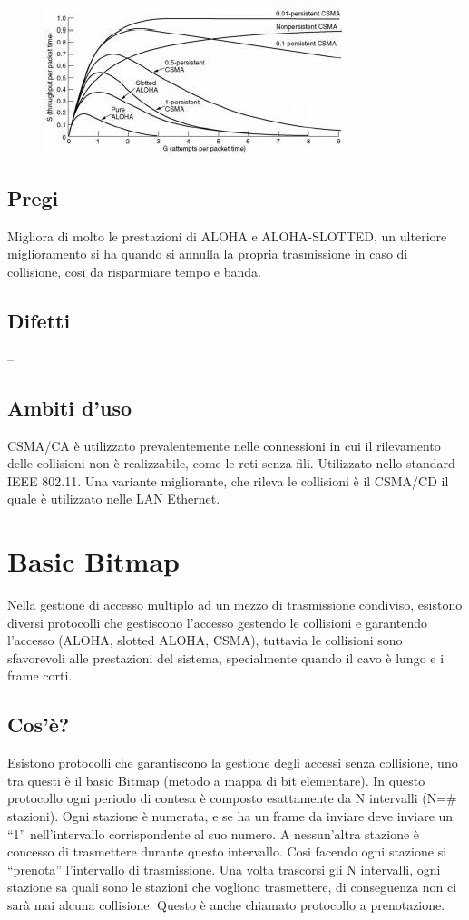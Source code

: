 \begin{figure}[H]
\centering
\includegraphics[scale=1]{res/img/23_CSMA.png}
\end{figure}

\subsection{Pregi}
Migliora di molto le prestazioni di ALOHA e ALOHA-SLOTTED, un ulteriore miglioramento si ha quando si annulla la propria trasmissione in caso di collisione, cosi da risparmiare tempo e banda.

\subsection{Difetti}
--

\subsection{Ambiti d'uso}
CSMA/CA è utilizzato prevalentemente nelle connessioni in cui il rilevamento delle collisioni non è realizzabile, come le reti senza fili.
Utilizzato nello standard IEEE 802.11.
Una variante migliorante, che rileva le collisioni è il CSMA/CD il quale è utilizzato nelle LAN Ethernet.

\section{Basic Bitmap}

Nella gestione di accesso multiplo ad un mezzo di trasmissione condiviso, esistono diversi protocolli che gestiscono l’accesso gestendo le collisioni e garantendo l’accesso (ALOHA, slotted ALOHA, CSMA), tuttavia le collisioni sono sfavorevoli alle prestazioni del sistema, specialmente quando il cavo è lungo e i frame corti.
\subsection{Cos'è?}
Esistono protocolli che garantiscono la gestione degli accessi senza collisione, uno tra questi è il basic Bitmap (metodo a mappa di bit elementare). In questo protocollo ogni periodo di contesa è composto esattamente da N intervalli (N=\# stazioni). Ogni stazione è numerata, e se ha un frame da inviare deve inviare un “1” nell’intervallo corrispondente al suo numero. A nessun’altra stazione è concesso di trasmettere durante questo intervallo. Cosi facendo ogni stazione si “prenota” l’intervallo di trasmissione. Una volta trascorsi gli N intervalli, ogni stazione sa quali sono le stazioni che vogliono trasmettere, di conseguenza non ci sarà mai alcuna collisione.
Questo è anche chiamato protocollo a prenotazione.

